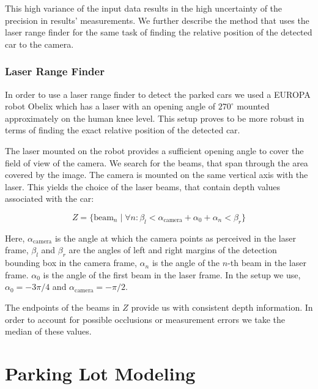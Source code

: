 This high variance of the input data results in the high uncertainty of the
precision in results' measurements. We further describe the method that uses
the laser range finder for the same task of finding the relative position of
the detected car to the camera.

\subsubsection{Laser Range Finder}\label{ssub:laser_range_finder}

In order to use a laser range finder to detect the parked cars we used a
EUROPA robot Obelix which has a laser with an opening angle of $270^\circ$
mounted approximately on the human knee level. This setup proves to be more
robust in terms of finding the exact relative position of the detected car.

The laser mounted on the robot provides a sufficient opening angle to cover
the field of view of the camera. We search for the beams, that span through
the area covered by the image. The camera is mounted on the same vertical axis
with the laser. This yields the choice of the laser beams, that contain depth
values associated with the car:

\begin{equation}
Z = \{ \mathrm{beam}_n \mid \forall n : \beta_{l} < \alpha_{\mathrm{camera}} + \alpha_{0} + \alpha_{n} < \beta_{r} \}
\end{equation}

Here, $\alpha_\mathrm{camera}$ is the angle at which the camera points as perceived
in the laser frame, $\beta_{l}$ and $\beta_{r}$ are the angles of left and
right margins of the detection bounding box in the camera frame, $\alpha_{n}$
is the angle of the $n$-th beam in the laser frame. $\alpha_{0}$ is the angle
of the first beam in the laser frame. In the setup we use, $\alpha_{0} =
-3\pi/4$ and $\alpha_\mathrm{camera} = -\pi/2$.

The endpoints of the beams in $Z$ provide us with consistent depth
information. In order to account for possible occlusions or measurement errors
we take the median of these values.


\section{Parking Lot Modeling} %
\label{sec:model}

